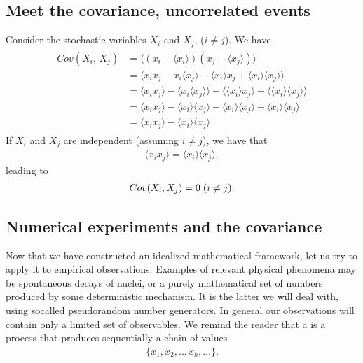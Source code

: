 \documentclass[letterpaper,10pt,english]{sphinxmanual}
\begin{document}
\subsection{Meet the  covariance, uncorrelated events}
\label{\detokenize{chapter2:meet-the-covariance-uncorrelated-events}}
Consider the stochastic variables \(X_i\) and \(X_j\), (\(i\neq j\)). We have
\begin{equation*}
\begin{split}
\begin{align*}
Cov(X_i,\,X_j) &= \langle (x_i-\langle x_i\rangle)(x_j-\langle x_j\rangle)\rangle\\
&=\langle x_i x_j - x_i\langle x_j\rangle - \langle x_i\rangle x_j + \langle x_i\rangle\langle x_j\rangle\rangle\\
&=\langle x_i x_j\rangle - \langle x_i\langle x_j\rangle\rangle - \langle \langle x_i\rangle x_j \rangle +
\langle \langle x_i\rangle\langle x_j\rangle\rangle \\
&=\langle x_i x_j\rangle - \langle x_i\rangle\langle x_j\rangle - \langle x_i\rangle\langle x_j\rangle +
\langle x_i\rangle\langle x_j\rangle \\
&=\langle x_i x_j\rangle - \langle x_i\rangle\langle x_j\rangle
\end{align*}
\end{split}
\end{equation*}
If \(X_i\) and \(X_j\) are independent (assuming \(i \neq j\)), we have that
\begin{equation*}
\begin{split}
\langle x_i x_j\rangle = \langle x_i\rangle\langle x_j\rangle,
\end{split}
\end{equation*}
leading to
\begin{equation*}
\begin{split}
Cov(X_i, X_j) = 0 \hspace{0.1cm} (i\neq j).
\end{split}
\end{equation*}

\subsection{Numerical experiments and the covariance}
\label{\detokenize{chapter2:numerical-experiments-and-the-covariance}}
Now that we have constructed an idealized mathematical framework, let
us try to apply it to empirical observations. Examples of relevant
physical phenomena may be spontaneous decays of nuclei, or a purely
mathematical set of numbers produced by some deterministic
mechanism. It is the latter we will deal with, using so\sphinxhyphen{}called pseudo\sphinxhyphen{}random
number generators.  In general our observations will contain only a limited set of
observables. We remind the reader that
a  is a process that produces sequentially a
chain of values
\begin{equation*}
\begin{split}
\{x_1, x_2,\dots\,x_k,\dots\}.
\end{split}
\end{equation*}
\end{document}
